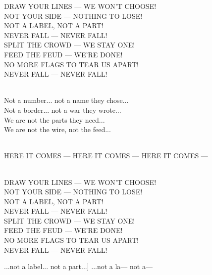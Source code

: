 \begin{lyrics}
DRAW YOUR LINES — WE WON'T CHOOSE!\\
NOT YOUR SIDE — NOTHING TO LOSE!\\
NOT A LABEL, NOT A PART!\\
NEVER FALL — NEVER FALL!\\
SPLIT THE CROWD — WE STAY ONE!\\
FEED THE FEUD — WE'RE DONE!\\
NO MORE FLAGS TO TEAR US APART!\\
NEVER FALL — NEVER FALL!

\\
Not a number... not a name they chose...\\
Not a border... not a war they wrote...\\
We are not the parts they need...\\
We are not the wire, not the feed...

\\
HERE IT COMES — HERE IT COMES — HERE IT COMES —

\\
DRAW YOUR LINES — WE WON'T CHOOSE!\\
NOT YOUR SIDE — NOTHING TO LOSE!\\
NOT A LABEL, NOT A PART!\\
NEVER FALL — NEVER FALL!\\
SPLIT THE CROWD — WE STAY ONE!\\
FEED THE FEUD — WE'RE DONE!\\
NO MORE FLAGS TO TEAR US APART!\\
NEVER FALL — NEVER FALL!

...not a label... not a part...]
...not a la— not a—
\end{lyrics}

